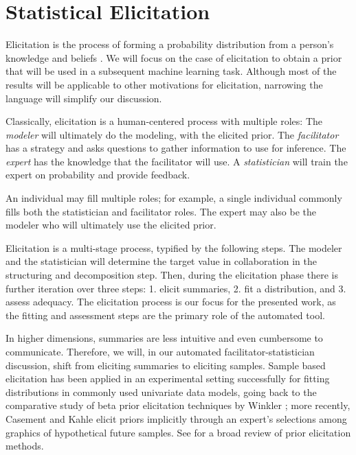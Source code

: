 \section{Statistical Elicitation}

Elicitation is the process of forming a probability distribution from a person's knowledge and beliefs \cite{OHagan2006,Garthwaite2005}. 
We will focus on the case of elicitation to obtain a prior that will be used in a subsequent machine learning task. Although most of the results will be applicable to other motivations for elicitation, narrowing the language will simplify our discussion. %

Classically, elicitation is a human-centered process with multiple roles:
The \emph{modeler} will ultimately do the modeling, with the elicited prior. 
The \emph{facilitator} has a strategy and asks questions to gather information to use for inference.  
The \emph{expert} has the knowledge that the facilitator will use. 
A \emph{statistician} will train the expert on probability and provide feedback. 

An individual may fill multiple roles; for example, a single individual commonly fills both the statistician and facilitator roles.  
The expert may also be the modeler who will ultimately use the elicited prior.

Elicitation is a multi-stage process, typified by the following steps.  The modeler and the statistician will determine the target value in collaboration in the structuring and decomposition step. Then, during the elicitation phase there is further iteration over three steps: 1. elicit summaries, 2. fit a distribution, and 3. assess adequacy. 
The elicitation process is our focus for the presented work, as the fitting and assessment steps are the primary role of the automated tool. 

In higher dimensions, summaries are less intuitive and even cumbersome to communicate.  Therefore, we will, in our automated facilitator-statistician discussion, shift from eliciting summaries to eliciting samples.
Sample based elicitation has been applied in an experimental setting successfully for fitting distributions in commonly used univariate data models, going back to the comparative study of beta prior elicitation techniques by Winkler \cite{Winkler1967}; more recently, Casement and Kahle \cite{CasementKahle2018} elicit priors implicitly through an expert's selections among graphics of hypothetical future samples. See \cite{Mikkola2023} for a broad review of prior elicitation methods.

